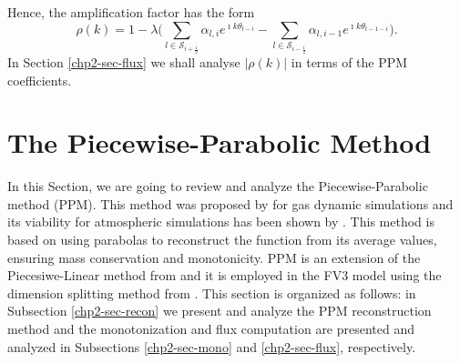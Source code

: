 Hence, the amplification factor has the form
\begin{equation}
\label{chp2-amplification}
\rho(k) = 1 - \lambda
					\bigg(\sum_{l \in \mathcal{S}_{i+\frac{1}{2}}} \alpha_{l,i}   e^{\imath k\theta_{l-i}} - 
					\sum_{l \in \mathcal{S}_{i-\frac{1}{2}}} \alpha_{l,i-1} e^{\imath k\theta_{l-1-i}} \bigg).
\end{equation}
In Section \ref{chp2-sec-flux} we shall analyse $|\rho(k)|$ in terms of the PPM coefficients.


\section{The Piecewise-Parabolic Method}
\label{chp2-sec-ppm}
In this Section, we are going to review and analyze the Piecewise-Parabolic method (PPM).
This method was proposed by \citet{colella:1984} for gas dynamic simulations and
its viability for atmospheric simulations has been shown by \citet{carpenter:1990}.
This method is based on using parabolas to reconstruct the function from its 
average values, ensuring mass conservation and monotonicity.
PPM is an extension of the Piecesiwe-Linear method from \citet{vanleer:1977}
and it is employed in the FV3 model using the dimension splitting method from \citet{lin:1996}.
This section is organized as follows: in Subsection \ref{chp2-sec-recon} 
we present and analyze the PPM reconstruction method and the monotonization and 
flux computation are presented and analyzed in Subsections 
\ref{chp2-sec-mono} and \ref{chp2-sec-flux}, respectively.

